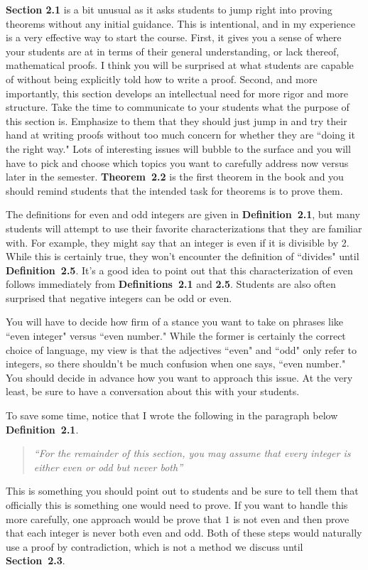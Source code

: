 \documentclass[11pt]{article}%
\newcommand{\blankline}{\pagebreak[2]\vspace{.5\baselineskip}}
\begin{document}
\blankline

\textbf{Section 2.1} is a bit unusual as it asks students to jump right into proving theorems without any initial guidance.  This is intentional, and in my experience is a very effective way to start the course.  First, it gives you a sense of where your students are at in terms of their general understanding, or lack thereof, mathematical proofs.  I think you will be surprised at what students are capable of without being explicitly told how to write a proof.  Second, and more importantly, this section develops an intellectual need for more rigor and more structure.  Take the time to communicate to your students what the purpose of this section is.  Emphasize to them that they should just jump in and try their hand at writing proofs without too much concern for whether they are ``doing it the right way." Lots of interesting issues will bubble to the surface and you will have to pick and choose which topics you want to carefully address now versus later in the semester.  \textbf{Theorem~2.2} is the first theorem in the book and you should remind students that the intended task for theorems is to prove them.

\blankline

The definitions for even and odd integers are given in \textbf{Definition~2.1}, but many students will attempt to use their favorite characterizations  that they are familiar with.  For example, they might say that an integer is even if it is divisible by 2.  While this is certainly true, they won't encounter the definition of ``divides" until \textbf{Definition~2.5}. It's a good idea to point out that this characterization of even follows immediately from \textbf{Definitions~2.1} and \textbf{2.5}. Students are also often surprised that negative integers can be odd or even.  

\blankline

You will have to decide how firm of a stance you want to take on phrases like ``even integer" versus ``even number."  While the former is certainly the correct choice of language, my view is that the adjectives ``even" and ``odd" only refer to integers, so there shouldn't be much confusion when one says, ``even number."  You should decide in advance how you want to approach this issue.  At the very least, be sure to have a conversation about this with your students.  

\blankline

To save some time, notice that I wrote the following in the paragraph below \textbf{Definition~2.1}.
\begin{quote}
\emph{``For the remainder of this section, you may assume that every integer is either even or odd but never both''}
\end{quote}
This is something you should point out to students and be sure to tell them that officially this is something one would need to prove. If you want to handle this more carefully, one approach would be prove that $1$ is not even and then prove that each integer is never both even and odd. Both of these steps would naturally use a proof by contradiction, which is not a method we discuss until \textbf{Section~2.3}.
\end{document}
